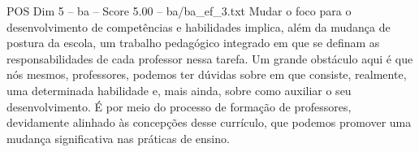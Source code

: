 \begin{textsample}{POS Dim 5 – ba – Score 5.00 – ba/ba\_ef\_3.txt}
Mudar o foco para o desenvolvimento de competências e habilidades implica, além da mudança de postura da escola, um trabalho pedagógico integrado em que se definam as responsabilidades de cada professor nessa tarefa.
Um grande obstáculo aqui é que nós mesmos, professores, podemos ter dúvidas sobre em que consiste, realmente, uma determinada habilidade e, mais ainda, sobre como auxiliar o seu desenvolvimento.
É por meio do processo de formação de professores, devidamente alinhado às concepções desse currículo, que podemos promover uma mudança significativa nas práticas de ensino.

\end{textsample}
